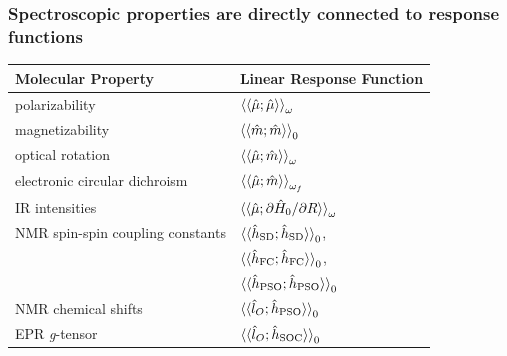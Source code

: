 \documentclass{beamer}
\begin{document}
\begin{frame}
  \frametitle{Spectroscopic properties are directly connected to response functions}
  \centering
  \begin{tabular}{ll}
    \toprule
    \textbf{Molecular Property}       & \textbf{Linear Response Function} \\
    \midrule
    polarizability                    & \( \braket{\braket{\hat{\mu};\hat{\mu}}}_{\omega} \) \\
    magnetizability                   & \( \braket{\braket{\hat{m};\hat{m}}}_{0} \) \\
    optical rotation                  & \( \braket{\braket{\hat{\mu};\hat{m}}}_{\omega} \) \\
    electronic circular dichroism     & \( \braket{\braket{\hat{\mu};\hat{m}}}_{\omega_{f}} \) \\
    IR intensities                    & \( \braket{\braket{\hat{\mu};\partial\hat{H}_{0}/\partial R}}_{\omega} \) \\
    NMR spin-spin coupling constants  & \( \braket{\braket{\hat{h}_{\text{SD}};\hat{h}_{\text{SD}}}}_{0} \), \\
                                      & \( \braket{\braket{\hat{h}_{\text{FC}};\hat{h}_{\text{FC}}}}_{0} \), \\
                                      & \( \braket{\braket{\hat{h}_{\text{PSO}};\hat{h}_{\text{PSO}}}}_{0} \) \\
    NMR chemical shifts               & \( \braket{\braket{\hat{l}_{O};\hat{h}_{\text{PSO}}}}_{0} \) \\
    EPR \textit{g}-tensor             & \( \braket{\braket{\hat{l}_{O};\hat{h}_{\text{SOC}}}}_{0} \) \\
    \bottomrule
  \end{tabular}
\end{frame}

\end{document}
